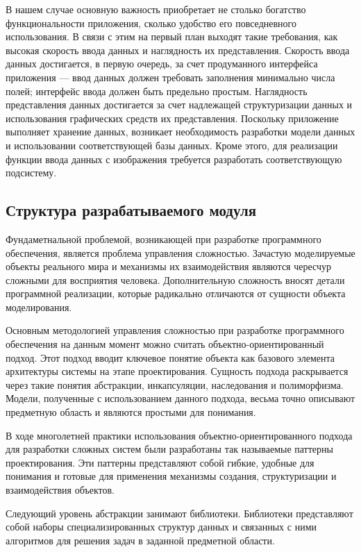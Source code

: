 В нашем случае основную важность приобретает не столько богатство
функциональности приложения, сколько удобство его повседневного использования.
В связи с этим на первый план выходят такие требования, как
высокая скорость ввода данных и наглядность их представления.
Скорость ввода данных достигается, в первую очередь, за счет
продуманного интерфейса приложения ---
ввод данных должен требовать заполнения минимально числа полей;
интерфейс ввода должен быть предельно простым.
Наглядность представления данных достигается за счет надлежащей
структуризации данных и использования графических средств их представления.
Поскольку приложение выполняет хранение данных, возникает необходимость
разработки модели данных и использовании соответствующей базы данных.
Кроме этого, для реализации функции ввода данных с изображения
требуется разработать соответствующую подсистему.

\subsection{Структура разрабатываемого модуля}
\label{subsec:design_structure}

Фундаметнальной проблемой, возникающей при разработке программного обеспечения,
является проблема управления сложностью. Зачастую моделируемые объекты реального
мира и механизмы их взаимодействия являются чересчур сложными для восприятия человека.
Дополнительную сложность вносят детали программной
реализации, которые радикально отличаются от сущности объекта моделирования.

Основным методологией управления сложностью при разработке программного обеспечения
на данным момент можно считать объектно-ориентированный подход.
Этот подход вводит ключевое понятие объекта как базового элемента
архитектуры системы на этапе проектирования.
Сущность подхода раскрывается через такие понятия абстракции, инкапсуляции,
наследования и полиморфизма.
Модели, полученные с использованием данного подхода, весьма точно
описывают предметную область и являются простыми для понимания.

В ходе многолетней практики использования объектно-ориентированного подхода
для разработки сложных систем были разработаны так называемые паттерны проектирования.
Эти паттерны представляют собой гибкие, удобные для понимания и
готовые для применения механизмы создания, структуризации и взаимодействия объектов.

Следующий уровень абстракции занимают библиотеки.
Библиотеки представляют собой наборы специализированных структур данных и
связанных с ними алгоритмов для решения задач в заданной предметной области.

